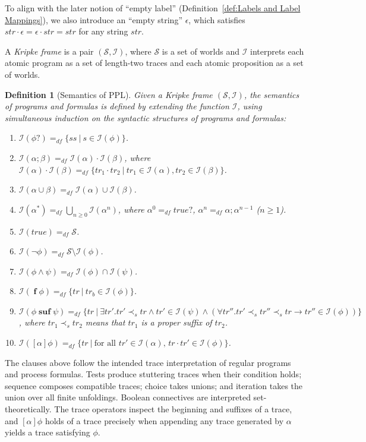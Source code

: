 \documentclass[manuscript,screen]{acmart}
\newtheorem{definition}{Definition}[section]
\newcommand{\mcl}[1]{\mathcal{#1}}
\newcommand{\dddef}[0]{=_{df}}
\newcommand{\true}[0]{\mathit{true}}
\newcommand{\psuf}[0]{\prec_s}
\DeclareMathOperator{\seq}{;}
\DeclareMathOperator{\cho}{\cup}
\newcommand{\Wd}[0]{\mcl{S}}
\newcommand{\I}[0]{\mcl{I}}
\DeclareMathOperator{\ofst}{\mathbf{f}}
\DeclareMathOperator{\osuf}{\mathbf{suf}}
\newcommand{\str}[0]{str}
\newcommand{\PPL}[0]{\mbox{PPL}}
\begin{document}
To align with the later notion of ``empty label'' (Definition~\ref{def:Labels and Label Mappings}), we also introduce an ``empty string'' $\epsilon$, which satisfies $\str\cdot \epsilon = \epsilon\cdot \str = \str$ for any string $\str$. 

A \emph{Kripke frame} is a pair $(\Wd,\I)$, where $\Wd$ is a set of worlds and $\I$ interprets each atomic program as a set of length-two traces and each atomic proposition as a set of worlds.

\begin{definition}[Semantics of \PPL]
    \label{Semantics of PPL}
Given a Kripke frame $(\Wd, \I)$, the semantics of programs and formulas is defined by extending the function $\I$, using simultaneous induction on the syntactic structures of programs and formulas: 
\begin{enumerate}
\item $\I(\phi?)\dddef \{ss\ |\ s\in \I(\phi)\}$.
\item $\I(\alpha\seq\beta)\dddef \I(\alpha) \cdot \I(\beta)$, where $\I(\alpha) \cdot \I(\beta)\dddef \{tr_1\cdot tr_2\ |\ tr_1\in \I(\alpha), tr_2\in \I(\beta)\}$.
\item $\I(\alpha\cho\beta)\dddef \I(\alpha)\cup \I(\beta)$.
\item $\I(\alpha^*)\dddef \bigcup_{n\ge 0} \I(\alpha^n)$, where $\alpha^0\dddef \true?$, $\alpha^n\dddef \alpha\seq\alpha^{n-1}$ ($n\ge 1$). 
\item $\I(\true)\dddef \Wd$.
\item $\I(\neg\phi)\dddef \Wd \setminus \I(\phi)$.
\item $\I(\phi\wedge \psi)\dddef \I(\phi)\cap \I(\psi)$.
\item $\I(\ofst \phi)\dddef \{tr\ |\ tr_b\in \I(\phi)\}$.
\item $\I(\phi\osuf \psi)\dddef \{tr\ |\ \exists tr'. tr'\psuf tr\wedge tr'\in \I(\psi) \wedge (\forall tr''. tr'\psuf tr''\psuf tr \to tr''\in \I(\phi))\}$, where $tr_1\psuf tr_2$ means that $tr_1$ is a proper suffix of $tr_2$.  
\item $\I([\alpha]\phi)\dddef \{tr\ |\ \mbox{for all $tr'\in \I(\alpha)$, $tr\cdot tr'\in \I(\phi)$}\}$.
\end{enumerate}
\end{definition}


The clauses above follow the intended trace interpretation of regular programs and process formulas. Tests produce stuttering traces when their condition holds; sequence composes compatible traces; choice takes unions; and iteration takes the union over all finite unfoldings. Boolean connectives are interpreted set-theoretically. The trace operators inspect the beginning and suffixes of a trace, and $[\alpha]\phi$ holds of a trace precisely when appending any trace generated by $\alpha$ yields a trace satisfying $\phi$. 
\end{document}
